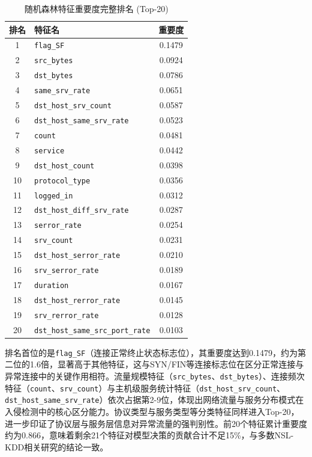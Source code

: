 \begin{table}[htbp]
\centering
\caption{随机森林特征重要度完整排名 (Top-20)}
\label{tab:featimp}
\small
\begin{tabular}{clc}
\toprule
排名 & 特征名                             & 重要度    \\
\midrule
1   & \texttt{flag\_SF}                       & 0.1479 \\
2   & \texttt{src\_bytes}                     & 0.0924 \\
3   & \texttt{dst\_bytes}                     & 0.0786 \\
4   & \texttt{same\_srv\_rate}                & 0.0651 \\
5   & \texttt{dst\_host\_srv\_count}          & 0.0587 \\
6   & \texttt{dst\_host\_same\_srv\_rate}     & 0.0523 \\
7   & \texttt{count}                          & 0.0481 \\
8   & \texttt{service}                        & 0.0442 \\
9   & \texttt{dst\_host\_count}               & 0.0398 \\
10  & \texttt{protocol\_type}                 & 0.0356 \\
11  & \texttt{logged\_in}                     & 0.0312 \\
12  & \texttt{dst\_host\_diff\_srv\_rate}     & 0.0287 \\
13  & \texttt{serror\_rate}                   & 0.0254 \\
14  & \texttt{srv\_count}                     & 0.0231 \\
15  & \texttt{dst\_host\_serror\_rate}        & 0.0210 \\
16  & \texttt{srv\_serror\_rate}              & 0.0189 \\
17  & \texttt{duration}                       & 0.0167 \\
18  & \texttt{dst\_host\_rerror\_rate}        & 0.0145 \\
19  & \texttt{srv\_rerror\_rate}              & 0.0128 \\
20  & \texttt{dst\_host\_same\_src\_port\_rate} & 0.0103 \\
\bottomrule
\end{tabular}
\end{table}

排名首位的是\texttt{flag\_SF}（连接正常终止状态标志位），其重要度达到0.1479，约为第二位的1.6倍，显著高于其他特征，这与SYN/FIN等连接标志位在区分正常连接与异常连接中的关键作用相符。流量规模特征（\texttt{src\_bytes}、\texttt{dst\_bytes}）、连接频次特征（\texttt{count}、\texttt{srv\_count}）与主机级服务统计特征（\texttt{dst\_host\_srv\_count}、\texttt{dst\_host\_same\_srv\_rate}）依次占据第2-9位，体现出网络流量与服务分布模式在入侵检测中的核心区分能力。协议类型与服务类型等分类特征同样进入Top-20，进一步印证了协议层与服务层信息对异常流量的强判别性。前20个特征累计重要度约为0.866，意味着剩余21个特征对模型决策的贡献合计不足15\%，与多数NSL-KDD相关研究的结论一致。
